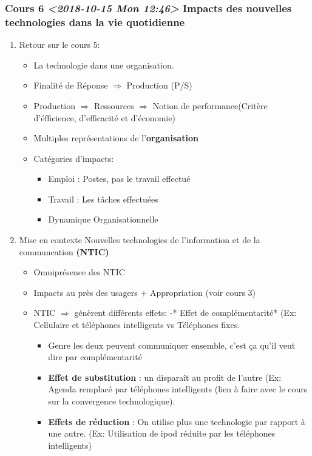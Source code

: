 \documentclass[11pt]{article}
\begin{document}
\subsubsection{Cours 6 \textit{<2018-10-15 Mon 12:46> } Impacts des nouvelles technologies dans la vie quotidienne}
\label{sec:orgb714a13}
\begin{enumerate}
\item Retour sur le cours 5:
\label{sec:org83e7f13}
\begin{itemize}
\item La technologie dans une organisation.
\item Finalité de Réponse \(\Rightarrow\) Production (P/S)
\item Production \(\Rightarrow\) Ressources \(\Rightarrow\) Notion de performance(Critère
d'éfficience, d'efficacité et d'économie)
\item Multiples représentations de l'\textbf{organisation}
\item Catégories d'impacts:
\begin{itemize}
\item Emploi : Postes, pas le travail effectué
\item Travail : Les tâches effectuées
\item Dynamique Organisationnelle
\end{itemize}
\end{itemize}
\item Mise en contexte Nouvelles technologies de l'information et de la communcation \textbf{(NTIC)}
\label{sec:org5e8ef17}
\begin{itemize}
\item Omniprésence des NTIC
\item Impacts au près des usagers + Appropriation (voir cours 3)
\item NTIC \(\Rightarrow\) génèrent différents effets:
-* Effet de complémentarité* (Ex: Cellulaire et téléphones intelligents vs
  Téléphones fixes.
\begin{itemize}
\item Genre les deux peuvent communiquer ensemble, c'est ça qu'il veut dire par complémentarité
\end{itemize}
\begin{itemize}
\item \textbf{Effet de substitution} : un disparaît au profit de l'autre (Ex: Agenda
remplacé par téléphones intelligents (lien à faire avec le cours sur la
convergence technologique).
\item \textbf{Effets de réduction} :  On utilise plus une technologie par rapport à
une autre. (Ex: Utilisation de ipod réduite par les téléphones intelligents)
\end{itemize}
\end{itemize}


\end{enumerate}
\end{document}
